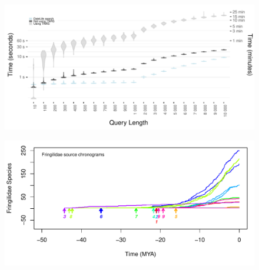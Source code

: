 \newpage

\begin{figure}[!h]
\includegraphics[width=1\linewidth]{fig_runtime1.pdf}
\caption{}
\label{fig:runtime1}
\end{figure}

\newpage

\begin{figure}[!h]
\includegraphics[width=1\linewidth]{fig_schronograms1.pdf}
\caption{}
\label{fig:schronograms}
\end{figure}

\newpage

